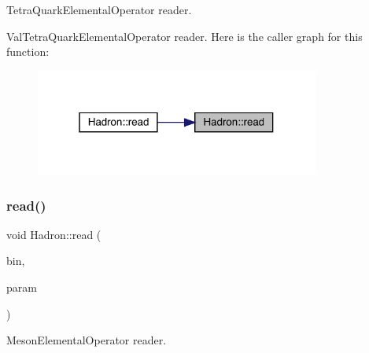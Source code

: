 Tetra\+Quark\+Elemental\+Operator reader. 

Val\+Tetra\+Quark\+Elemental\+Operator reader. Here is the caller graph for this function\+:\nopagebreak
\begin{figure}[H]
\begin{center}
\leavevmode
\includegraphics[width=265pt]{d1/daf/namespaceHadron_a614faa9c1c7ae1880f009d5c9aa672ec_icgraph}
\end{center}
\end{figure}
\mbox{\label{namespaceHadron_ae34c01603f5e8f9246374fddfaa8e062}} 
\subsubsection{\texorpdfstring{read()}{read()}\hspace{0.1cm}{\footnotesize\ttfamily [58/94]}}
{\footnotesize\ttfamily void Hadron\+::read (\begin{DoxyParamCaption}\item[{\mbox{\hyperlink{classADATIO_1_1BinaryReader}{Binary\+Reader}} \&}]{bin,  }\item[{\mbox{\hyperlink{structHadron_1_1ValMesonElementalOperator__t}{Val\+Meson\+Elemental\+Operator\+\_\+t}} \&}]{param }\end{DoxyParamCaption})}



Meson\+Elemental\+Operator reader. 

